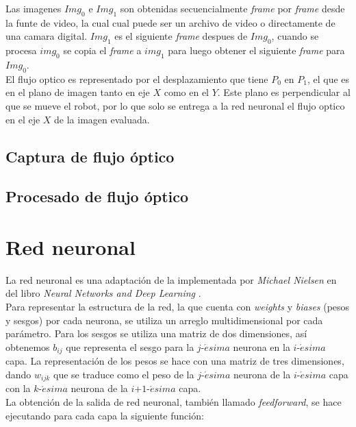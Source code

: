 \documentclass{iccmemoria}
\begin{document}
Las imagenes $Img_0$ e $Img_1$ son obtenidas secuencialmente \emph{frame} por \emph{frame} desde la funte de video, la cual cual puede ser un archivo de video o directamente de una camara digital. $Img_1$ es el siguiente \emph{frame} despues de $Img_0$, cuando se procesa $img_0$ se copia el \emph{frame} a $img_1$ para luego obtener el siguiente \emph{frame} para $Img_0$.\\

El flujo optico es representado por el desplazamiento que tiene $P_0$ en $P_1$, el que es en el plano de imagen tanto en eje $X$ como en el $Y$. Este plano es perpendicular al que se mueve el robot, por lo que solo se entrega a la red neuronal el flujo optico en el eje $X$ de la imagen evaluada.\\



\subsection{Captura de flujo óptico}

\subsection{Procesado de flujo óptico}

\section{Red neuronal}

La red neuronal es una adaptación de la implementada por \emph{Michael Nielsen} en del libro \emph{Neural Networks and Deep Learning} \cite{NeuralNetworksAndDeepLearning}.\\
 
Para representar la estructura de la red, la que cuenta con \emph{weights} y \emph{biases} (pesos y sesgos) por cada neurona, se utiliza un arreglo multidimensional por cada parámetro. Para los sesgos se utiliza una matriz de dos dimensiones, así obtenemos $b_{ij}$ que representa el sesgo para la $j$-$\acute{e}sima$ neurona en la $i$-$\acute{e}sima$ capa. La representación de los pesos se hace con una matriz de tres dimensiones, dando $w_{ijk}$ que se traduce como el peso de la $j$-$\acute{e}sima$ neurona de la $i$-$\acute{e}sima$ capa con la $k$-$\acute{e}sima$ neurona de la $i$+$1$-$\acute{e}sima$ capa.\\
 
La obtención de la salida de red neuronal, también llamado \emph{feedforward}, se hace ejecutando para cada capa la siguiente función:\\
\end{document}
